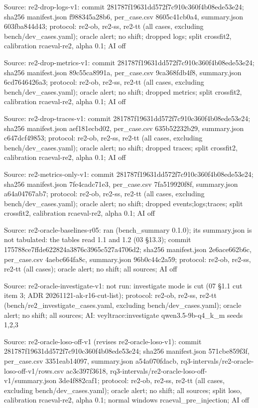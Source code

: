 \noindent Source: re2-drop-logs-v1: commit 281787f19631dd572f7c910c360f4b08ede53e24; sha256 manifest.json f988345a28b6, per\_case.csv 8605c41cb0a4, summary.json 603fba844d43; protocol: re2-ob, re2-ss, re2-tt (all cases, excluding bench/\allowbreak{}dev\_cases.yaml); oracle alert; no shift; dropped logs; split crossfit2, calibration rcaeval-re2, alpha 0.1; AI off\par
\noindent Source: re2-drop-metrics-v1: commit 281787f19631dd572f7c910c360f4b08ede53e24; sha256 manifest.json 89c55ca8991a, per\_case.csv 9ca368fdb4f8, summary.json 6cd7646426a3; protocol: re2-ob, re2-ss, re2-tt (all cases, excluding bench/\allowbreak{}dev\_cases.yaml); oracle alert; no shift; dropped metrics; split crossfit2, calibration rcaeval-re2, alpha 0.1; AI off\par
\noindent Source: re2-drop-traces-v1: commit 281787f19631dd572f7c910c360f4b08ede53e24; sha256 manifest.json aef181ecbd02, per\_case.csv 635b52232b29, summary.json c647dcf49853; protocol: re2-ob, re2-ss, re2-tt (all cases, excluding bench/\allowbreak{}dev\_cases.yaml); oracle alert; no shift; dropped traces; split crossfit2, calibration rcaeval-re2, alpha 0.1; AI off\par
\noindent Source: re2-metrics-only-v1: commit 281787f19631dd572f7c910c360f4b08ede53e24; sha256 manifest.json 7fe4cadc71e3, per\_case.csv 7fa519920f8f, summary.json a64a04767ab7; protocol: re2-ob, re2-ss, re2-tt (all cases, excluding bench/\allowbreak{}dev\_cases.yaml); oracle alert; no shift; dropped events;logs;traces; split crossfit2, calibration rcaeval-re2, alpha 0.1; AI off\par
\noindent Source: re2-oracle-baselines-r05: ran (bench\_summary 0.1.0); its summary.json is not tabulated: the tables read 1.1 and 1.2 (03 \S{}13.3); commit 175788ce7ffde622824a3876c3965c527a4706d2; sha256 manifest.json 2e6ace662b6c, per\_case.csv 4aebc664fa8c, summary.json 96b0c44c2a59; protocol: re2-ob, re2-ss, re2-tt (all cases); oracle alert; no shift; all sources; AI off\par
\noindent Source: re2-oracle-investigate-v1: not run: investigate mode is cut (07 \S{}1.1 cut item 3; ADR 20261121-ak-r16-cut-list); protocol: re2-ob, re2-ss, re2-tt (bench/\allowbreak{}re2\_investigate\_cases.yaml, excluding bench/\allowbreak{}dev\_cases.yaml); oracle alert; no shift; all sources; AI: veyltrace:investigate qwen3.5-9b-q4\_k\_m seeds 1,2,3\par
\noindent Source: re2-oracle-loso-off-v1 (revises re2-oracle-loso-v1): commit 281787f19631dd572f7c910c360f4b08ede53e24; sha256 manifest.json 571cbe859f3f, per\_case.csv 3351eab14097, summary.json a54a070fdacb, rq3-intervals/\allowbreak{}re2-oracle-loso-off-v1/\allowbreak{}rows.csv ac3c397f3618, rq3-intervals/\allowbreak{}re2-oracle-loso-off-v1/\allowbreak{}summary.json 3de4f882caf1; protocol: re2-ob, re2-ss, re2-tt (all cases, excluding bench/\allowbreak{}dev\_cases.yaml); oracle alert; no shift; all sources; split loso, calibration rcaeval-re2, alpha 0.1; normal windows rcaeval\_pre\_injection; AI off\par
